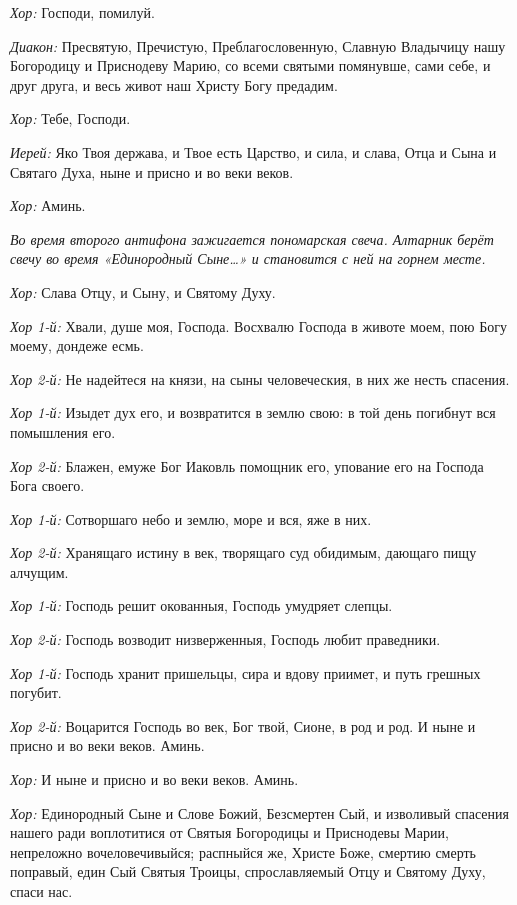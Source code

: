 \begin{mymulticols}
{\itshape Хор:} Господи, помилуй. 

{\itshape Диакон:} Пресвятую, Пречистую, Преблагословенную, Славную Владычицу нашу Богородицу и Приснодеву Марию, со всеми святыми помянувше, сами себе, и друг друга, и весь живот наш Христу Богу предадим. 

{\itshape Хор:} Тебе, Господи. 

{\itshape Иерей:} Яко Твоя держава, и Твое есть Царство, и сила, и слава, Отца и Сына и Святаго Духа, ныне и присно и во веки веков. 

{\itshape Хор:} Аминь. 


{\itshape Во время второго антифона зажигается пономарская свеча. Алтарник берёт свечу во время «Единородный Сыне…» и становится с ней на горнем месте.}

{\itshape Хор:} Слава Отцу, и Сыну, и Святому Духу. 

{\itshape Хор 1-й:} Хвали, душе моя, Господа. Восхвалю Господа в животе моем, пою Богу моему, дондеже есмь. 

{\itshape Хор 2-й:} Не надейтеся на князи, на сыны человеческия, в них же несть спасения. 

{\itshape Хор 1-й:} Изыдет дух его, и возвратится в землю свою: в той день погибнут вся помышления его. 

{\itshape Хор 2-й:} Блажен, емуже Бог Иаковль помощник его, упование его на Господа Бога своего. 

{\itshape Хор 1-й:} Сотворшаго небо и землю, море и вся, яже в них. 

{\itshape Хор 2-й:} Хранящаго истину в век, творящаго суд обидимым, дающаго пищу алчущим. 

{\itshape Хор 1-й:} Господь решит окованныя, Господь умудряет слепцы. 

{\itshape Хор 2-й:} Господь возводит низверженныя, Господь любит праведники. 

{\itshape Хор 1-й:} Господь хранит пришельцы, сира и вдову приимет, и путь грешных погубит. 

{\itshape Хор 2-й:} Воцарится Господь во век, Бог твой, Сионе, в род и род. И ныне и присно и во веки веков. Аминь. 

{\itshape Хор:} И ныне и присно и во веки веков. Аминь. 


{\itshape Хор:} Единородный Сыне и Слове Божий, Безсмертен Сый, и изволивый спасения нашего ради воплотитися от Святыя Богородицы и Приснодевы Марии, непреложно вочеловечивыйся; распныйся же, Христе Боже, смертию смерть поправый, един Сый Святыя Троицы, спрославляемый Отцу и Святому Духу, спаси нас. 


\end{mymulticols}
